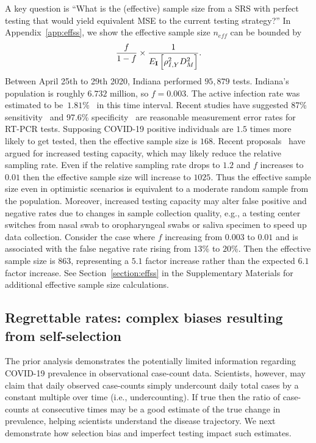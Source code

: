 \documentclass[11pt]{amsart}
\numberwithin{equation}{section}
\theoremstyle{plain}
\def\I{\bf I}
\begin{document}
 A key question is ``What is the (effective) sample size from a SRS with perfect testing that would yield equivalent MSE to the current testing strategy?'' In Appendix~\ref{app:effss}, we show the effective sample size $n_{eff}$ can be bounded by
 $$
 \frac{f}{1-f} \times \frac{1}{E_{\I} \left[ \rho_{I,Y}^2 D_M^2 \right]}.
 $$
 Between April 25th to 29th 2020, Indiana performed $95,879$ tests.  Indiana's population is roughly $6.732$ million, so $f = 0.003$.  The active infection rate was estimated to be~$1.81\%$~\citep{Yiannoutsos2021} in this time interval. Recent studies have suggested 87\% sensitivity~\citep{Arevalo2020} and 97.6\% specificity~\citep{Cohen2020} are reasonable measurement error rates for RT-PCR tests. Supposing COVID-19 positive individuals are $1.5$ times more likely to get tested, then the effective sample size is $168$. Recent proposals~\citep{Siddarth2020} have argued for increased testing capacity, which may likely reduce the relative sampling rate.  Even if the relative sampling rate drops to $1.2$ and $f$ increases to $0.01$ then the effective sample size will increase to $1025$.  Thus the effective sample size even in optimistic scenarios is equivalent to a moderate random sample from the population.  Moreover, increased testing capacity may alter false positive and negative rates due to changes in sample collection quality, e.g., a testing center switches from nasal swab to oropharyngeal swabs or saliva specimen to speed up data collection.  Consider the case where $f$ increasing from $0.003$ to $0.01$ and is associated with the false negative rate rising from $13\%$ to $20$\%.  Then the effective sample size is $863$, representing a $5.1$ factor increase rather than the expected $6.1$ factor increase. See Section~\ref{section:effss} in the Supplementary Materials for additional effective sample size calculations.


 \subsection{Regrettable rates: complex biases resulting from self-selection}
 \label{section:rates}

 The prior analysis demonstrates the potentially limited information regarding COVID-19 prevalence in observational case-count data.  Scientists, however, may claim that daily observed case-counts simply undercount daily total cases by a constant multiple over time (i.e., undercounting).  If true then the ratio of case-counts at consecutive times may be a good estimate of the true change in prevalence, helping scientists understand the disease trajectory.  We next demonstrate how selection bias and imperfect testing impact such estimates.
\end{document}

